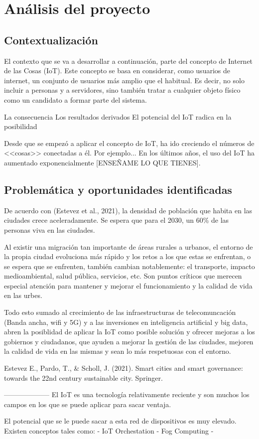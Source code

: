 \documentclass[12pt, a4paper, twoside]{article}
\begin{document}


\newpage

\tableofcontents

\section{Análisis del proyecto}
\subsection{Contextualización}
El contexto que se va a desarrollar a continuación, parte del concepto de Internet de las Cosas (IoT).
Este concepto se basa en considerar, como usuarios de internet, un conjunto de usuarios más amplio que el 
habitual. Es decir, no solo incluir a personas y a servidores, sino también tratar a cualquier objeto 
físico como un candidato a formar parte del sistema.

La consecuencia
Los resultados derivados
El potencial del IoT radica en la posibilidad

Desde que se empezó a aplicar el concepto de IoT, ha ido creciendo el números de <<cosas>> conectadas a él. 
Por ejemplo...
En los últimos  años, el uso del IoT ha aumentado exponencialmente [ENSEÑAME LO QUE TIENES].
\subsection{Problemática y oportunidades identificadas}
De acuerdo con (Estevez et al., 2021), la densidad de población que habita en las ciudades crece aceleradamente.
Se espera que para el 2030, un 60\% de las personas viva en las ciudades. 

Al existir una migración tan importante de áreas rurales a urbanos, el entorno de la
propia ciudad evoluciona más rápido y los retos a los que estas se enfrentan, o se espera que se enfrenten,
también cambian notablemente: el transporte, impacto medioambiental, salud pública, servicios, etc. Son puntos
críticos que merecen especial atención para mantener y mejorar el funcionamiento y la calidad de vida en
las urbes.

Todo esto sumado al crecimiento de las infraestructuras de telecomuncación (Banda ancha, wifi y 5G)
y a las inversiones en inteligencia artificial y big data, abren la posiblidad de aplicar la IoT como
posible solución y ofrecer mejoras a los gobiernos y ciudadanos, que ayuden a mejorar la gestión de las 
ciudades, mejoren la calidad de vida en las mismas y sean lo más respetuosas con el entorno.

Estevez E., Pardo, T., \& Scholl, J. (2021).
Smart cities and smart governance: towards the 22nd century sustainable city. Springer.


--------------------
El IoT es una tecnología relativamente reciente y son muchos los campos en los que se puede 
aplicar para sacar ventaja.

El potencial que se le puede sacar a esta red de dispositivos es muy elevado. Existen conceptos tales como:
 - IoT Orchestation
 - Fog Computing
 - 
\end{document}
